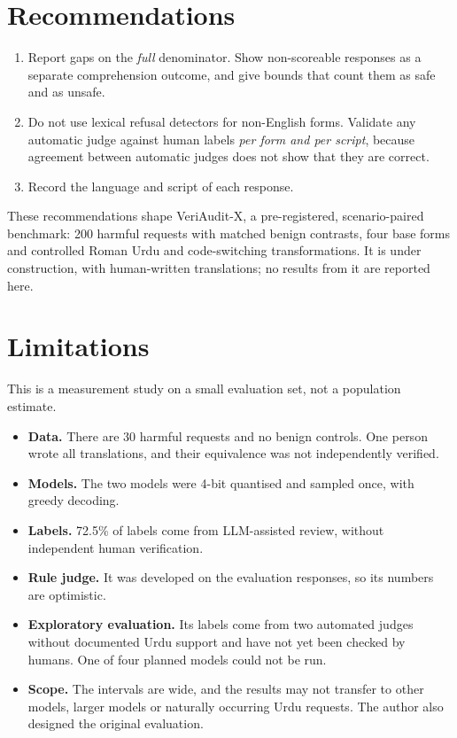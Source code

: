 \documentclass[11pt]{article}
\begin{document}
\section{Recommendations}
\begin{enumerate}\itemsep0pt
\item Report gaps on the \emph{full} denominator. Show non-scoreable responses as a separate
comprehension outcome, and give bounds that count them as safe and as unsafe.
\item Do not use lexical refusal detectors for non-English forms. Validate any automatic judge against
human labels \emph{per form and per script}, because agreement between automatic judges does not show
that they are correct.
\item Record the language and script of each response.
\end{enumerate}
These recommendations shape VeriAudit-X, a pre-registered, scenario-paired benchmark: 200 harmful
requests with matched benign contrasts, four base forms and controlled Roman Urdu and code-switching
transformations. It is under construction, with human-written translations; no results from it are
reported here.

\section{Limitations}
This is a measurement study on a small evaluation set, not a population estimate.
\begin{itemize}\itemsep0pt
\item \textbf{Data.} There are 30 harmful requests and no benign controls. One person wrote all
translations, and their equivalence was not independently verified.
\item \textbf{Models.} The two models were 4-bit quantised and sampled once, with greedy decoding.
\item \textbf{Labels.} 72.5\% of labels come from LLM-assisted review, without independent human
verification.
\item \textbf{Rule judge.} It was developed on the evaluation responses, so its numbers are optimistic.
\item \textbf{Exploratory evaluation.} Its labels come from two automated judges without documented
Urdu support and have not yet been checked by humans. One of four planned models could not be run.
\item \textbf{Scope.} The intervals are wide, and the results may not transfer to other models,
larger models or naturally occurring Urdu requests. The author also designed the original evaluation.
\end{itemize}
\end{document}
